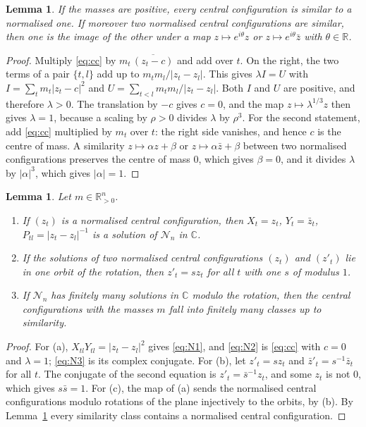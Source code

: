 \documentclass[11pt]{amsart}
\newtheorem{lemma}[theorem]{Lemma}
\theoremstyle{definition}
\theoremstyle{remark}
\numberwithin{equation}{section}
\newcommand{\CC}{\mathbb{C}}
\newcommand{\RR}{\mathbb{R}}
\newcommand{\cN}{\mathcal{N}}
\begin{document}
\begin{lemma}\label{lem:norm}
If the masses are positive, every central configuration is similar to a normalised one. If moreover two
normalised central configurations are similar, then one is the image of the other under a map
$z \mapsto e^{i\theta} z$ or $z \mapsto e^{i\theta} \bar z$ with $\theta \in \RR$.
\end{lemma}

\begin{proof}
Multiply \eqref{eq:cc} by $m_t\, \overline{(z_t - c)}$ and add over $t$. On the right, the two terms of a
pair $\{t, l\}$ add up to $m_t m_l / |z_t - z_l|$. This gives $\lambda I = U$ with
$I = \sum_t m_t |z_t - c|^2$ and $U = \sum_{t < l} m_t m_l / |z_t - z_l|$. Both $I$ and $U$ are positive,
and therefore $\lambda > 0$. The translation by $-c$ gives $c = 0$, and the map
$z \mapsto \lambda^{1/3} z$ then gives $\lambda = 1$, because a scaling by $\rho > 0$ divides $\lambda$
by $\rho^{3}$. For the second statement, add \eqref{eq:cc} multiplied by $m_t$ over $t$: the right side
vanishes, and hence $c$ is the centre of mass. A similarity $z \mapsto \alpha z + \beta$ or
$z \mapsto \alpha \bar z + \beta$ between two normalised configurations preserves the centre of mass
$0$, which gives $\beta = 0$, and it divides $\lambda$ by $|\alpha|^{3}$, which gives $|\alpha| = 1$.
\end{proof}

\begin{lemma}\label{lem:cc-sol}
Let $m \in \RR_{>0}^n$.
\begin{enumerate}
\item[(a)] If $(z_t)$ is a normalised central configuration, then $X_t = z_t$, $Y_t = \bar z_t$,
$P_{tl} = |z_t - z_l|^{-1}$ is a solution of $\cN_n$ in $\CC$.
\item[(b)] If the solutions of two normalised central configurations $(z_t)$ and $(z'_t)$ lie in one orbit
of the rotation, then $z'_t = s z_t$ for all $t$ with one $s$ of modulus $1$.
\item[(c)] If $\cN_n$ has finitely many solutions in $\CC$ modulo the rotation, then the central
configurations with the masses $m$ fall into finitely many classes up to similarity.
\end{enumerate}
\end{lemma}

\begin{proof}
For (a), $X_{tl} Y_{tl} = |z_t - z_l|^2$ gives \eqref{eq:N1}, and \eqref{eq:N2} is \eqref{eq:cc} with
$c = 0$ and $\lambda = 1$; \eqref{eq:N3} is its complex conjugate. For (b), let $z'_t = s z_t$ and
$\bar z'_t = s^{-1} \bar z_t$ for all $t$. The conjugate of the second equation is
$z'_t = \bar s^{-1} z_t$, and some $z_t$ is not $0$, which gives $s \bar s = 1$. For (c), the map of (a)
sends the normalised central configurations modulo rotations of the plane injectively to the orbits, by
(b). By Lemma~\ref{lem:norm} every similarity class contains a normalised central configuration.
\end{proof}
\end{document}
